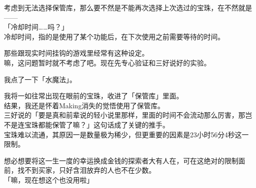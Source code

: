 考虑到无法选择保管库，那么要不然是不能再次选择上次选过的宝珠，在不然就是——\\

「冷却时间……吗？」\\

冷却时间，指的是使用了某个功能后，在下次使用之前需要等待的时间。

那些跟现实时间挂钩的游戏里经常有这种设定。\\

嘛，这问题暂时就不考虑了吧。现在先专心验证和三好说好的实验。

我点了一下「水魔法」。

我将一如往常出现在眼前的宝珠，收进了「保管库」里面。\\

结果，我还是怀着Making消失的觉悟使用了保管库。\\

三好说的「要是真和前辈说的轻小说里那样，里面的时间不会流动那么厉害，那岂不是连宝珠都能保管了嘛？」这句话成了关键的推手。\\

宝珠难以流通，其原因一是数量极为稀少，但更重要的因素是23小时56分4秒这一限制。

想必想要将这一生一度的幸运换成金钱的探索者大有人在，可在这绝对的限制面前，找不到买家，只好含泪放弃的人也不在少数。\\

「嘛，现在想这个也没用啦」\\

